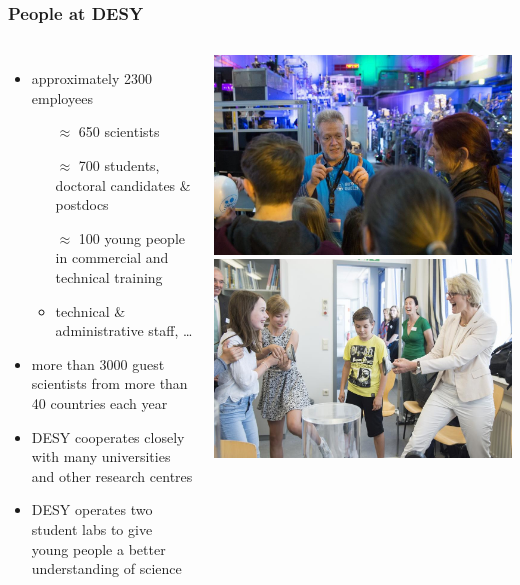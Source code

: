 \documentclass[10pt,t]{beamer}
\begin{document}
\begin{frame}
\frametitle{People at DESY}
\vspace*{-2\baselineskip}
\begin{columns}[c]
\begin{itemize}
    \item approximately 2300 employees
    \begin{itemize}
        \item[$\approx\!$] 650 scientists
        \item[$\approx\!$] 700 students, doctoral candidates \& postdocs
        \item[$\approx\!$] 100 young people in commercial and technical training
        \item technical \& administrative staff, \dots
    \end{itemize}
    \item more than 3000 guest scientists from more than 40 countries each year
    \item DESY cooperates closely with many universities and other research centres
    \item DESY operates two student labs to give young people a better understanding of science
\end{itemize}
    \includegraphics[width=\textwidth]{menschen3} \\[1ex]
    \includegraphics[width=\textwidth]{menschen2} \vspace*{-1cm}
\end{columns}
\end{frame}
\end{document}
